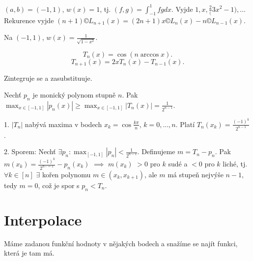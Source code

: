 \documentclass[12pt]{article}					%
\begin{document}
\begin{definice}
	$(a, b) = (-1, 1)$, $w(x) = 1$, tj. $(f, g) = \int_{-1}^1 f g dx$. Vyjde $1, x, \frac{2}(3x^2 - 1), …$ Rekurence vyjde $(n+1) ©L_{n+1}(x) = (2n+1)x ©L_n(x) - n©L_{n-1}(x)$.
\end{definice}

\begin{definice}
	Na $(-1, 1)$, $w(x) = \frac{1}{\sqrt{1 - x^2}}$.

	$$ T_n(x) = \cos(n \arccos x). $$
	$$ T_{n+1}(x) = 2x T_n(x) - T_{n-1}(x). $$

	\begin{dukazin}[Ortogonalita]
		Zintegruje se a zasubstituuje.
	\end{dukazin}
\end{definice}

\begin{veta}
	Nechť $p_n$ je monický polynom stupně $n$. Pak $\max_{x \in [-1, 1]}|p_n(x)| ≥ \max_{x \in [-1, 1]} |T_n(x)| = \frac{1}{2^{n-1}}$.

	\begin{dukazin}
		1. $|T_n|$ nabývá maxima v bodech $x_k = \cos \frac{k\pi}{n}$, $k = 0, …, n$. Platí $T_n(x_k) = \frac{(-1)^k}{2^{n-1}}$.

		2. Sporem: Nechť $\exists p_n: \max_{[-1, 1]} |p_n| < \frac{1}{2^{n-1}}$. Definujeme $m = T_n - p_n$. Pak $m(x_k) = \frac{(-1)^k}{2^{n-=1}} - p_n(x_k)$ $\implies$ $m(x_k)$ $>0$ pro $k$ sudé a $<0$ pro $k$ liché, tj. $\forall k \in [n]$ $\exists$ kořen polynomu $m \in (x_k, x_{k+1})$, ale $m$ má stupeň nejvýše $n - 1$, tedy $m=0$, což je spor s $p_n < T_n$.
	\end{dukazin}
\end{veta}


\section{Interpolace}
\begin{definice}[Interpolace]
	Máme zadanou funkční hodnoty v nějakých bodech a snažíme se najít funkci, která je tam má.
\end{definice}
\end{document}
